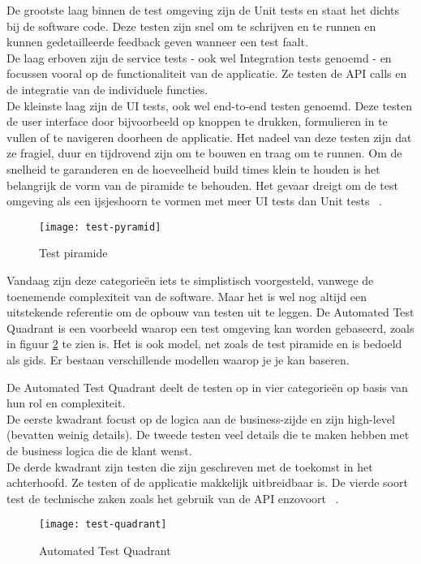         De grootste laag binnen de test omgeving zijn de Unit tests en staat het dichts bij de software code. Deze testen zijn snel om te schrijven en te runnen en kunnen gedetailleerde feedback geven wanneer een test faalt.\\
        De laag erboven zijn de service tests - ook wel Integration tests genoemd - en focussen vooral op de functionaliteit van de applicatie. Ze testen de API calls en de integratie van de individuele functies.\\
        De kleinste laag zijn de UI tests, ook wel end-to-end testen genoemd. Deze testen de user interface door bijvoorbeeld op knoppen te drukken, formulieren in te vullen of te navigeren doorheen de applicatie. Het nadeel van deze testen zijn dat ze fragiel, duur en tijdrovend zijn om te bouwen en traag om te runnen.
        Om de snelheid te garanderen en de hoeveelheid build times klein te houden is het belangrijk de vorm van de piramide te behouden. Het gevaar dreigt om de test omgeving als een ijsjeshoorn te vormen met meer UI tests dan Unit tests ~\autocite{Fowler2012}.
        \begin{figure}
            \centering
            \texttt{[image: test-pyramid]}
            \caption{Test piramide ~\autocite{Vocke2018}} \label{img-test-pyramid}
        \end{figure}
        
        Vandaag zijn deze categorieën iets te simplistisch voorgesteld, vanwege de toenemende complexiteit van de software. Maar het is wel nog altijd een uitstekende referentie om de opbouw van testen uit te leggen.
        De Automated Test Quadrant is een voorbeeld waarop een test omgeving kan worden gebaseerd, zoals in figuur \ref{img-test-quadrant} te zien is. Het is ook model, net zoals de test piramide en is bedoeld als gids. Er bestaan verschillende modellen waarop je je kan baseren.
        
        De Automated Test Quadrant deelt de testen op in vier categorieën op basis van hun rol en complexiteit.\\
        De eerste kwadrant focust op de logica aan de business-zijde en zijn high-level (bevatten weinig details). De tweede testen veel details die te maken hebben met de business logica die de klant wenst.\\
        De derde kwadrant zijn testen die zijn geschreven met de toekomst in het achterhoofd. Ze testen of de applicatie makkelijk uitbreidbaar is. De vierde soort test de technische zaken zoals het gebruik van de API enzovoort ~\autocite{Smart2017}.
        
        \begin{figure}
            \centering
            \texttt{[image: test-quadrant]}
            \caption{Automated Test Quadrant ~\autocite{Smart2017}} \label{img-test-quadrant}
        \end{figure}